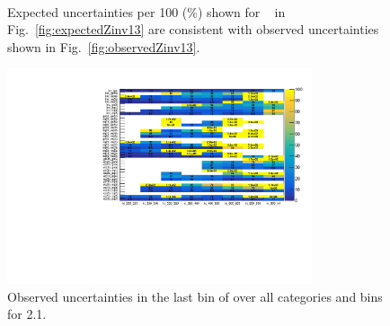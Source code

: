 \begin{figure}[h!]
  \centering
  ~~
  \\
  \caption{\label{fig:expectedObservedZinv13} Expected uncertainties per 100 \GeV (\%) shown for \zInv~ in Fig.~\ref{fig:expectedZinv13} are consistent
  with observed uncertainties shown in Fig.~\ref{fig:observedZinv13}.}
\end{figure}
\begin{figure}[h!]
  \centering
  \includegraphics[width=0.8\textwidth]{figures/template/frenchFlagLastBin.pdf}
  \caption{\label{fig:frenchFlagLastBin} Observed uncertainties in the 
  last bin of \mht over all categories and \scalht bins for 2.1\ifb.}
\end{figure}

